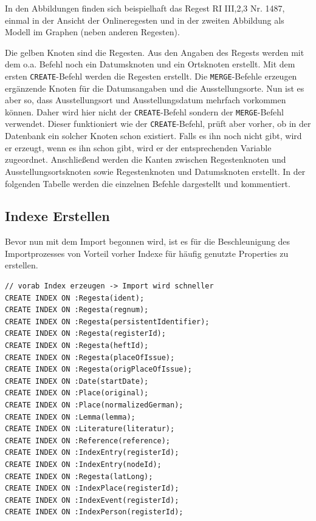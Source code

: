 \documentclass[ngerman,]{scrreprt}
\begin{document}
In den Abbildungen finden sich beispielhaft das Regest RI III,2,3 Nr. 1487, einmal in der Ansicht der Onlineregesten und in der zweiten Abbildung als Modell im Graphen (neben anderen Regesten).

Die gelben Knoten sind die Regesten. Aus den Angaben des Regests werden mit dem o.a. Befehl noch ein Datumsknoten und ein Ortsknoten erstellt. Mit dem ersten \texttt{CREATE}-Befehl werden die Regesten erstellt. Die \texttt{MERGE}-Befehle erzeugen ergänzende Knoten für die Datumsangaben und die Ausstellungsorte. Nun ist es aber so, dass Ausstellungsort und Ausstellungsdatum mehrfach vorkommen können. Daher wird hier nicht der \texttt{CREATE}-Befehl sondern der \texttt{MERGE}-Befehl verwendet. Dieser funktioniert wie der \texttt{CREATE}-Befehl, prüft aber vorher, ob in der Datenbank ein solcher Knoten schon existiert. Falls es ihn noch nicht gibt, wird er erzeugt, wenn es ihn schon gibt, wird er der entsprechenden Variable zugeordnet. Anschließend werden die Kanten zwischen Regestenknoten und Ausstellungsortsknoten sowie Regestenknoten und Datumsknoten erstellt. In der folgenden Tabelle werden die einzelnen Befehle dargestellt und kommentiert.

\hypertarget{indexe-erstellen}{%
\subsection{Indexe Erstellen}\label{indexe-erstellen}}

Bevor nun mit dem Import begonnen wird, ist es für die Beschleunigung des Importprozesses von Vorteil vorher Indexe für häufig genutzte Properties zu erstellen.

\begin{verbatim}
// vorab Index erzeugen -> Import wird schneller
CREATE INDEX ON :Regesta(ident);
CREATE INDEX ON :Regesta(regnum);
CREATE INDEX ON :Regesta(persistentIdentifier);
CREATE INDEX ON :Regesta(registerId);
CREATE INDEX ON :Regesta(heftId);
CREATE INDEX ON :Regesta(placeOfIssue);
CREATE INDEX ON :Regesta(origPlaceOfIssue);
CREATE INDEX ON :Date(startDate);
CREATE INDEX ON :Place(original);
CREATE INDEX ON :Place(normalizedGerman);
CREATE INDEX ON :Lemma(lemma);
CREATE INDEX ON :Literature(literatur);
CREATE INDEX ON :Reference(reference);
CREATE INDEX ON :IndexEntry(registerId);
CREATE INDEX ON :IndexEntry(nodeId);
CREATE INDEX ON :Regesta(latLong);
CREATE INDEX ON :IndexPlace(registerId);
CREATE INDEX ON :IndexEvent(registerId);
CREATE INDEX ON :IndexPerson(registerId);
\end{verbatim}
\end{document}
